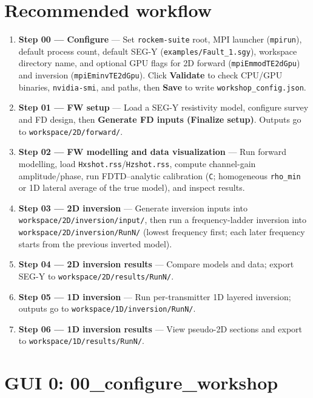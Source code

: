 \documentclass[11pt,a4paper]{article}
\begin{document}
\section{Recommended workflow}

\begin{enumerate}
  \item \textbf{Step 00 — Configure} — Set \texttt{rockem-suite} root, MPI launcher (\texttt{mpirun}), default process count, default SEG-Y (\texttt{examples/Fault\_1.sgy}), workspace directory name, and optional GPU flags for 2D forward (\texttt{mpiEmmodTE2dGpu}) and inversion (\texttt{mpiEminvTE2dGpu}). Click \textbf{Validate} to check CPU/GPU binaries, \texttt{nvidia-smi}, and paths, then \textbf{Save} to write \texttt{workshop\_config.json}.
  \item \textbf{Step 01 — FW setup} — Load a SEG-Y resistivity model, configure survey and FD design, then \textbf{Generate FD inputs (Finalize setup)}. Outputs go to \texttt{workspace/2D/forward/}.
  \item \textbf{Step 02 — FW modelling and data visualization} — Run forward modelling, load \texttt{Hxshot.rss}/\texttt{Hzshot.rss}, compute channel-gain amplitude/phase, run FDTD--analytic calibration (\texttt{C}; homogeneous \texttt{rho\_min} or 1D lateral average of the true model), and inspect results.
  \item \textbf{Step 03 — 2D inversion} — Generate inversion inputs into \texttt{workspace/2D/inversion/input/}, then run a frequency-ladder inversion into \texttt{workspace/2D/inversion/RunN/} (lowest frequency first; each later frequency starts from the previous inverted model).
  \item \textbf{Step 04 — 2D inversion results} — Compare models and data; export SEG-Y to \texttt{workspace/2D/results/RunN/}.
  \item \textbf{Step 05 — 1D inversion} — Run per-transmitter 1D layered inversion; outputs go to \texttt{workspace/1D/inversion/RunN/}.
  \item \textbf{Step 06 — 1D inversion results} — View pseudo-2D sections and export to \texttt{workspace/1D/results/RunN/}.
\end{enumerate}

\section{GUI 0: 00\_configure\_workshop}
\end{document}
